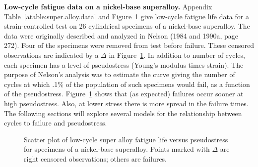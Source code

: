 \begin{example}
\label{example:super.alloy.data}
{\bf Low-cycle fatigue data on a nickel-base superalloy.}  Appendix
Table~\ref{atable:super.alloy.data} and
Figure~\ref{figure:super.alloy.data} give low-cycle fatigue life
data for a strain-controlled test on 26 cylindrical specimens of a
nickel-base superalloy.  The data were originally described and
analyzed in Nelson (1984 and 1990a, page 272).  Four of the
specimens were removed from test before failure.  These censored
observations are indicated by a $\Delta$ in
Figure~\ref{figure:super.alloy.data}.  In addition to number of
cycles, each specimen has a level of pseudostress (Young's modulus
times strain).  The purpose of Nelson's analysis was to estimate the
curve giving the number of cycles at which .1\% of the population of
such specimens would fail, as a function of the pseudostress.
Figure~\ref{figure:super.alloy.data} shows that (as expected)
failures occur sooner at high pseudostress.  Also, at lower stress
there is more spread in the failure times.  The following sections
will explore several models for the relationship between cycles to
failure and pseudostress.
\end{example}
\begin{figure}
\caption{Scatter plot of low-cycle super 
alloy fatigue life versus pseudostress for specimens of a
nickel-base superalloy. Points marked with $\Delta$ are right
censored observations; others are failures.}
\label{figure:super.alloy.data}
\end{figure}
